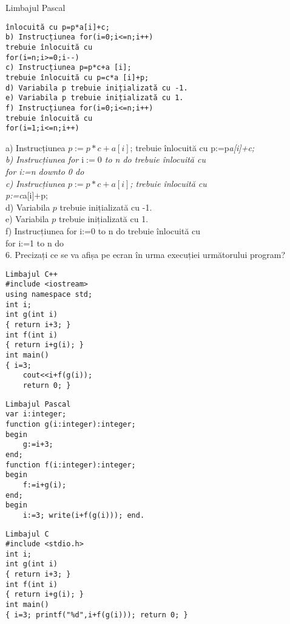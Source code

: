 Limbajul Pascal

\begin{verbatim}
înlocuită cu p=p*a[i]+c;
b) Instrucțiunea for(i=0;i<=n;i++)
trebuie înlocuită cu
for(i=n;i>=0;i--)
c) Instrucțiunea p=p*c+a [i];
trebuie înlocuită cu p=c*a [i]+p;
d) Variabila p trebuie inițializată cu -1.
e) Variabila p trebuie inițializată cu 1.
f) Instrucțiunea for(i=0;i<=n;i++)
trebuie înlocuită cu
for(i=1;i<=n;i++)
\end{verbatim}

a) Instrucțiunea $p:=p * c+a[i]$; trebuie înlocuită cu p:=p\textit{a[i]+c;\\
b) Instrucțiunea for $\mathrm{i}:=0$ to n do trebuie înlocuită cu\\
for i:=n downto 0 do\\
c) Instrucțiunea $p:=p * c+a[i]$; trebuie înlocuită cu\\
p:=c}a[i]+p;\\
d) Variabila $p$ trebuie inițializată cu -1.\\
e) Variabila $p$ trebuie inițializată cu 1.\\
f) Instrucțiunea for i:=0 to n do trebuie înlocuită cu\\
for i:=1 to n do\\
6. Precizați ce se va afișa pe ecran în urma execuției următorului program?

\begin{verbatim}
Limbajul C++
#include <iostream>
using namespace std;
int i;
int g(int i)
{ return i+3; }
int f(int i)
{ return i+g(i); }
int main()
{ i=3;
    cout<<i+f(g(i));
    return 0; }
\end{verbatim}

\begin{verbatim}
Limbajul Pascal
var i:integer;
function g(i:integer):integer;
begin
    g:=i+3;
end;
function f(i:integer):integer;
begin
    f:=i+g(i);
end;
begin
    i:=3; write(i+f(g(i))); end.
\end{verbatim}

\begin{verbatim}
Limbajul C
#include <stdio.h>
int i;
int g(int i)
{ return i+3; }
int f(int i)
{ return i+g(i); }
int main()
{ i=3; printf("%d",i+f(g(i))); return 0; }
\end{verbatim}

